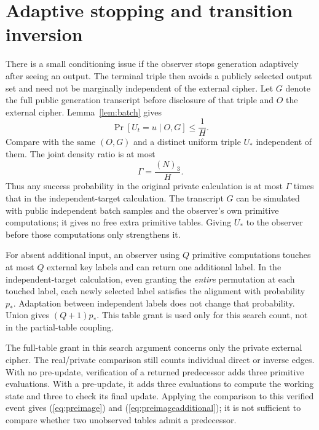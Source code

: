 \documentclass[journal=tosc,preprint,floatrow,nohyperxmp]{iacrtrans}
\newif\ifjordireview
\newcounter{jordinote}
\newcommand{\jordinote}[2]{%
  \ifjordireview
  \stepcounter{jordinote}\par\medskip\noindent
  \fcolorbox{blue!55!black}{blue!4}{%
    \begin{minipage}{\dimexpr\linewidth-2\fboxsep-2\fboxrule\relax}
    \small\raggedright\color{blue!45!black}
    \textbf{Solo Jordi -- J\thejordinote: #1}\par\smallskip
    #2
    \end{minipage}}\par\medskip
  \fi
}
\numberwithin{lemma}{section}
\numberwithin{proposition}{section}
\newcommand{\fall}[2]{(#1)_{#2}}
\numberwithin{equation}{section}
\theoremstyle{definition}
\numberwithin{definition}{section}
\theoremstyle{plain}
\begin{document}
\section{Adaptive stopping and transition inversion}\label{app:inversion}
There is a small conditioning issue if the observer stops generation adaptively after seeing an output. The terminal triple then avoids a publicly selected output set and need not be marginally independent of the external cipher. Let $G$ denote the full public generation transcript before disclosure of that triple and $O$ the external cipher. Lemma~\ref{lem:batch} gives
\[
 \Pr[U_t=u\mid O,G]\le\frac1H.
\]
Compare with the same $(O,G)$ and a distinct uniform triple $U_*$ independent of them. The joint density ratio is at most
\begin{equation}
 \Gamma=\frac{\fall N3}{H}.\label{eq:gamma}
\end{equation}
Thus any success probability in the original private calculation is at most $\Gamma$ times that in the independent-target calculation. The transcript $G$ can be simulated with public independent batch samples and the observer's own primitive computations; it gives no free extra primitive tables. Giving $U_*$ to the observer before those computations only strengthens it.

For absent additional input, an observer using $Q$ primitive computations touches at most $Q$ external key labels and can return one additional label. In the independent-target calculation, even granting the \emph{entire} permutation at each touched label, each newly selected label satisfies the alignment with probability $p_*$. Adaptation between independent labels does not change that probability. Union gives $(Q+1)p_*$. This table grant is used only for this search count, not in the partial-table coupling.

The full-table grant in this search argument concerns only the private external cipher. The real/private comparison still counts individual direct or inverse edges. With no pre-update, verification of a returned predecessor adds three primitive evaluations. With a pre-update, it adds three evaluations to compute the working state and three to check its final update. Applying the comparison to this verified event gives (\ref{eq:preimage}) and (\ref{eq:preimageadditional}); it is not sufficient to compare whether two unobserved tables admit a predecessor.

\jordinote{Revisión de la reducción de inversión}{En este apéndice, $\Gamma$ corrige el sesgo de parar tras observar salida. Revisa por qué es un factor multiplicativo. La concesión de tablas completas solo se usa en el conteo privado de etiquetas, no en el acoplamiento real. Las tres o seis evaluaciones añadidas verifican el candidato devuelto: permiten comparar el mismo evento observable, no una existencia abstracta de preimágenes.}

\clearpage
\begingroup\small


\endgroup
\end{document}
